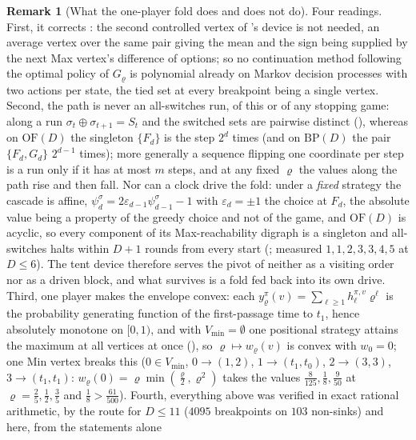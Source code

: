 \documentclass[11pt]{article}
\theoremstyle{plain}
\theoremstyle{definition}
\newtheorem{remark}[theorem]{Remark}
\newcommand{\Vmin}{V_{\min}}
\begin{document}
\begin{remark}[What the one-player fold does and does not do]\label{rem:one-player-fold}
Four readings. First, it corrects : the second controlled
vertex of 's device is not needed, an average vertex over the
same pair giving the mean and the sign being supplied by the next Max
vertex's difference of options; so no continuation method following the
optimal policy of $G_\varrho$ is polynomial already on Markov decision
processes with two actions per state, the tied set at every breakpoint being
a single vertex. Second, the path is never an all-switches run, of this or
of any stopping game: along a run $\sigma_{t}\oplus\sigma_{t+1}=S_t$ and the
switched sets are pairwise distinct (), whereas on
$\mathrm{OF}(D)$ the singleton $\{F_d\}$ is the step $2^{d}$ times (and on
$\mathrm{BP}(D)$ the pair $\{F_d,G_d\}$ $2^{d-1}$ times); more generally a
sequence flipping one coordinate per step is a run only if it has at most
$m$ steps, and at any fixed $\varrho$ the values along the path rise and
then fall. Nor can a clock drive the fold: under a \emph{fixed} strategy the
cascade is affine, $\psi^{\sigma}_{d}=2\varepsilon_{d-1}\psi^{\sigma}_{d-1}-1$
with $\varepsilon_{d}=\pm1$ the choice at $F_d$, the absolute value being a
property of the greedy choice and not of the game, and $\mathrm{OF}(D)$ is
acyclic, so every component of its Max-reachability digraph is a singleton
and all-switches halts within $D+1$ rounds from every start
(; measured $1,1,2,3,3,4,5$ at $D\le6$). The
tent device therefore serves the pivot of  neither
as a visiting order nor as a driven block, and what survives is a fold fed
back into its own drive. Third, one player makes the envelope convex: each
$y^{\pi}_{\varrho}(v)=\sum_{\ell\ge1}h^{\pi,v}_{\ell}\varrho^{\ell}$ is the
probability generating function of the first-passage time to $t_1$, hence
absolutely monotone on $[0,1)$, and with $\Vmin=\emptyset$ one positional
strategy attains the maximum at all vertices at once (), so
$\varrho\mapsto w_\varrho(v)$ is convex with $w_0=0$; one Min vertex breaks
this ($0\in\Vmin$, $0\to(1,2)$, $1\to(t_1,t_0)$, $2\to(3,3)$,
$3\to(t_1,t_1)$: $w_\varrho(0)=\varrho\min(\tfrac\varrho2,\varrho^{2})$ takes
the values $\tfrac8{125},\tfrac18,\tfrac9{50}$ at $\varrho=\tfrac25,\tfrac12,\tfrac35$
and $\tfrac18>\tfrac{61}{500}$). Fourth, everything above was verified in
exact rational arithmetic, by the route for $D\le11$ ($4095$ breakpoints on
$103$ non-sinks) and here, from the statements alone

\end{remark}
\end{document}
